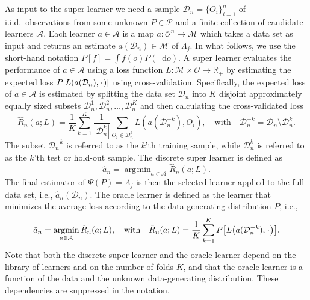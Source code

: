 \documentclass{statsoc}
\numberwithin{theorem}{section}
\newcommand{\R}{\mathbb{R}}
\newcommand{\blank}{\makebox[1ex]{\textbf{$\cdot$}}}
\newcommand*\diff{\mathop{}\!\mathrm{d}}
\newcommand{\1}{\mathds{1}}
\DeclareMathOperator*{\argmin}{\arg\!\min}
\newcommand{\empmeas}{\ensuremath{\mathbb{P}_n}} %
\newcommand{\data}{\ensuremath{\mathcal{D}}}
\begin{document}
As input to the super learner we need a sample \( \data_n=\{O_i\}_{i=1}^n \) of
i.i.d.\ observations from some unknown \( P \in \mathcal{P} \) and a finite
collection of candidate learners $\mathcal{A}$. Each learner
\(a \in \mathcal{A}\) is a map
\( a \colon \mathcal{O}^n \rightarrow \mathcal{M}\) which takes a data set as
input and returns an estimate $a(\data_n) \in \mathcal{M}$ of $\Lambda_{j}$.
In what follows, we use the short-hand notation
\(P[f] = \int f(o) P(\diff o) \). A super learner evaluates the
performance of \(a \in \mathcal{A}\) using a loss function
\(L\colon \mathcal{M} \times \mathcal{O} \rightarrow \R_+\) by
estimating the expected loss \(P[L(a(\data_n), \blank)]\) using
cross-validation. Specifically, the expected loss of $a\in\mathcal A$
is estimated by splitting the data set $\data_n$ into $K$ disjoint
approximately equally sized subsets
\(\data_n^1, \data_n^2, \dots, \data_n^K \) and then calculating the
cross-validated loss
\begin{equation*}
  \hat{R}_n(a; L) =
  \frac{1}{K}\sum_{k=1}^{K}
  \frac{1}{| \data_n^{k} |}\sum_{O_i \in \data_n^{k}}
  L
  {
    \left(
      a{ (\data_n^{-k})}
      , O_i
    \right)
  },
  \quad \text{with} \quad
  \data_n^{-k} = \data_n \setminus \data_n^{k}.
\end{equation*}
The subset \(\data_n^{-k}\) is referred to as the \(k\)'th training
sample, while \(\data_n^{k}\) is referred to as the \(k\)'th test or
hold-out sample.
The discrete super learner is defined as
\begin{equation*}
\hat{a}_n = \argmin_{a\in\mathcal A}\hat{R}_n(a; L).
\end{equation*}
The final estimator of \(\Psi(P)=\Lambda_j\) is then the selected
learner applied to the full data set, i.e., \(\hat{a}_n(\data_n)\).
The oracle learner is defined as the learner that minimizes the
average loss according to the data-generating distribution \( P \),
i.e.,
\begin{equation*}
  \tilde{a}_n =
  \argmin_{a \in \mathcal{A}}
  \tilde{R}_n(a; L),
  \quad \text{with} \quad 
  \tilde{R}_n(a; L)=
  \frac{1}{K}\sum_{k=1}^{K} 
  P{
    \left[
      L
      {
        \left(
          a{ (\data_n^{-k})}
          , \blank
        \right)
      }
    \right]}
  .
\end{equation*}
Note that both the discrete super learner and the oracle learner depend on the
library of learners and on the number of folds \(K\), and that the oracle
learner is a function of the data and the unknown data-generating distribution.
These dependencies are suppressed in the notation.
\end{document}
